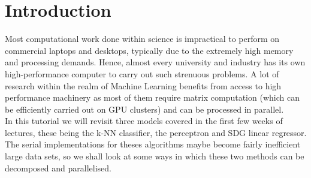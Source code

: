 \section{Introduction}
Most computational work done within science is impractical to perform on commercial laptops and desktops, typically due to the extremely high memory and processing demands. Hence, almost every university and industry has its own high-performance computer to carry out such strenuous problems. A lot of research within the realm of Machine Learning benefits from access to high performance machinery as most of them require matrix computation (which can be efficiently carried out on GPU clusters) and can be processed in parallel.\\[1\baselineskip]
In this tutorial we will revisit three models covered in the first few weeks of lectures, these being the k-NN classifier, the perceptron and SDG linear regressor. The serial implementations for theses algorithms maybe become fairly inefficient large data sets, so we shall look at some ways in which these two methods can be decomposed and parallelised.